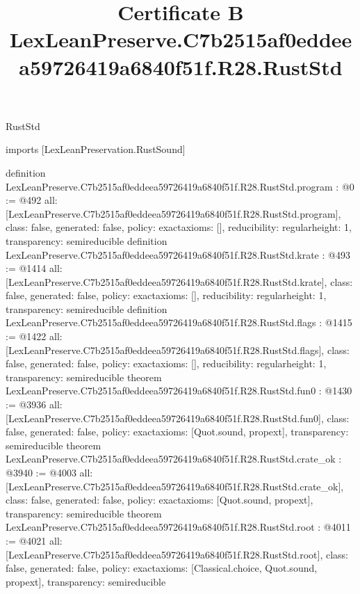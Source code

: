 \begin{lexlean}{RustStd}
\title{Certificate B LexLeanPreserve.C7b2515af0eddeea59726419a6840f51f.R28.RustStd}
\begin{coremodule}
imports [LexLeanPreservation.RustSound]

definition LexLeanPreserve.C7b2515af0eddeea59726419a6840f51f.R28.RustStd.program : @0 := @492 {
  all: [LexLeanPreserve.C7b2515af0eddeea59726419a6840f51f.R28.RustStd.program],
  class: false,
  generated: false,
  policy: exact{axioms: []},
  reducibility: regular{height: 1},
  transparency: semireducible
}
definition LexLeanPreserve.C7b2515af0eddeea59726419a6840f51f.R28.RustStd.krate : @493 := @1414 {
  all: [LexLeanPreserve.C7b2515af0eddeea59726419a6840f51f.R28.RustStd.krate],
  class: false,
  generated: false,
  policy: exact{axioms: []},
  reducibility: regular{height: 1},
  transparency: semireducible
}
definition LexLeanPreserve.C7b2515af0eddeea59726419a6840f51f.R28.RustStd.flags : @1415 := @1422 {
  all: [LexLeanPreserve.C7b2515af0eddeea59726419a6840f51f.R28.RustStd.flags],
  class: false,
  generated: false,
  policy: exact{axioms: []},
  reducibility: regular{height: 1},
  transparency: semireducible
}
theorem LexLeanPreserve.C7b2515af0eddeea59726419a6840f51f.R28.RustStd.fun0 : @1430 := @3936 {
  all: [LexLeanPreserve.C7b2515af0eddeea59726419a6840f51f.R28.RustStd.fun0],
  class: false,
  generated: false,
  policy: exact{axioms: [Quot.sound, propext]},
  transparency: semireducible
}
theorem LexLeanPreserve.C7b2515af0eddeea59726419a6840f51f.R28.RustStd.crate_ok : @3940 := @4003 {
  all: [LexLeanPreserve.C7b2515af0eddeea59726419a6840f51f.R28.RustStd.crate_ok],
  class: false,
  generated: false,
  policy: exact{axioms: [Quot.sound, propext]},
  transparency: semireducible
}
theorem LexLeanPreserve.C7b2515af0eddeea59726419a6840f51f.R28.RustStd.root : @4011 := @4021 {
  all: [LexLeanPreserve.C7b2515af0eddeea59726419a6840f51f.R28.RustStd.root],
  class: false,
  generated: false,
  policy: exact{axioms: [Classical.choice, Quot.sound, propext]},
  transparency: semireducible
}


\end{coremodule}
\end{lexlean}
